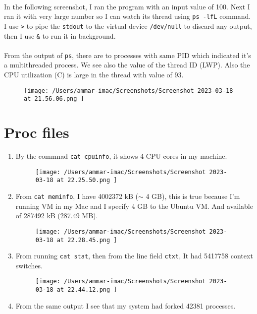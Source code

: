 \documentclass{article}
\def\c#1{\texttt{#1}}
\begin{document}
\paragraph{}
In the following screenshot, I ran the program with an input value of 100. Next I ran it with very large
number so I can watch its thread using \c{ps -lfL} command. I use \c{>} to pipe the \c{stdout} to
the virtual device \c{/dev/null} to discard any output, then I use \c{\&} to run it in background.

\paragraph{}
From the output of \c{ps}, there are to processes with same PID which indicated it's a multithreaded
process. We see also the value of the thread ID (LWP). Also the CPU utilization (C) is large in the thread
with value of 93.
\begin{figure}[ht]
	\centering
	\texttt{[image: /Users/ammar-imac/Screenshots/Screenshot 2023-03-18 at 21.56.06.png ]}
\end{figure}



\section{Proc files}%
\begin{enumerate}
	\item By the commnad \c{cat cpuinfo}, it shows 4 CPU cores in my machine.
	      \begin{figure}[ht]
		      \centering
		      \texttt{[image: /Users/ammar-imac/Screenshots/Screenshot 2023-03-18 at 22.25.50.png ]}
	      \end{figure}
        \newpage
	\item From \c{cat meminfo}, I have 4002372 kB ($\sim$ 4 GB), this is true because I'm running VM in my Mac and I
        specify 4 GB to the Ubuntu VM. And available of 287492 kB (287.49 MB).
	      \begin{figure}[ht]
		      \centering
		      \texttt{[image: /Users/ammar-imac/Screenshots/Screenshot 2023-03-18 at 22.28.45.png ]}
	      \end{figure}
   \item From running \c{cat stat}, then from the line field \c{ctxt}, It had 5417758 context switches.
	      \begin{figure}[ht]
		      \centering
		      \texttt{[image: /Users/ammar-imac/Screenshots/Screenshot 2023-03-18 at 22.44.12.png ]}
	      \end{figure}
   \item From the same output I see that my system had forked 42381 processes.
\end{enumerate}
\end{document}
